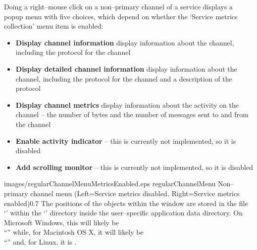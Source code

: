 Doing a right--mouse click on a non--primary channel of a service displays a popup menu
with five choices, which depend on whether the `Service metrics collection' menu item is
enabled:
\begin{itemize}
\item \textbf{Display channel information} display information about the channel,
including the protocol for the channel
\item \textbf{Display detailed channel information} display information about the channel,
including the protocol for the channel and a description of the protocol
\item \textbf{Display channel metrics} display information about the activity on the
channel -- the number of bytes and the number of messages sent to and from the channel
\item \textbf{Enable activity indicator} -- this is currently not implemented, so it is
disabled
\item \textbf{Add scrolling monitor} -- this is currently not implemented, so it is
disabled
\end{itemize}
%
{images/regularChannelMenuMetricsEnabled.eps}%
{regularChannelMenu}%
{Non--primary channel menu (Left=Service metrics disabled, Right=Service metrics
enabled)}{0.7}
\clearpage
The positions of the objects within the window are stored in the file
`' within the `' directory inside the
user--specific application data directory.
On Microsoft Windows, this will likely be\\
``'' while, for Macintosh OS X, it will likely be\\
``'' and, for Linux, it is \TBD.\\
\primaryEnd{}
